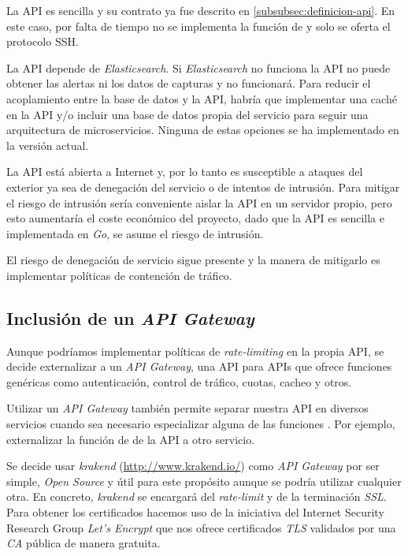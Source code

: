 La API es sencilla y su contrato ya fue descrito en \ref{subsubsec:definicion-api}. En este caso, por falta de tiempo no se implementa
la función de  y solo se oferta el protocolo SSH.

La API depende de \emph{Elasticsearch}. Si \emph{Elasticsearch} no funciona la API no puede obtener las alertas ni los datos de capturas y no funcionará. Para reducir el acoplamiento entre la base de datos y la API, habría que implementar una caché 
en la API y/o incluir una base de datos propia del servicio para seguir una arquitectura de microservicios. Ninguna de estas opciones se ha implementado en la versión actual.


La API está abierta a Internet y, por lo tanto es susceptible a ataques del exterior ya sea de denegación del servicio o de intentos de intrusión. 
Para mitigar el riesgo de intrusión sería conveniente aislar la API en un servidor propio, pero esto aumentaría el coste económico del proyecto, dado 
que la API es sencilla e implementada en \emph{Go}, se asume el riesgo de intrusión.

El riesgo de denegación de servicio sigue presente y la manera de mitigarlo es implementar políticas de contención de tráfico.


\subsection{Inclusión de un \emph{API Gateway} }

Aunque podríamos implementar políticas de \emph{rate-limiting} en la propia API, se decide externalizar a un \emph{API Gateway}, una API para APIs que ofrece funciones genéricas como
autenticación, control de tráfico, cuotas, cacheo y otros. 

Utilizar un \emph{API Gateway} también permite separar nuestra API en diversos servicios cuando sea necesario especializar alguna de las funciones
. Por ejemplo, externalizar la función de  de la API a otro servicio. 

Se decide usar \emph{krakend} (\href{http://www.krakend.io/}{http://www.krakend.io/}) como \emph{API Gateway} por ser simple, \emph{Open Source} y útil para este propósito aunque se podría utilizar cualquier otra. En concreto, 
\emph{krakend} se encargará del \emph{rate-limit} y de la terminación \emph{SSL}. Para obtener los certificados hacemos uso de la iniciativa del Internet Security Research Group \emph{Let's Encrypt} que nos
ofrece certificados \emph{TLS} validados por una \emph{CA} pública de manera gratuita.

